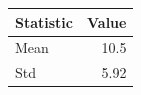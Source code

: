 \begin{tabular}{lr}
\toprule
Statistic & Value \\
\midrule
Mean & 10.5 \\
Std & 5.92 \\
\bottomrule
\end{tabular}

